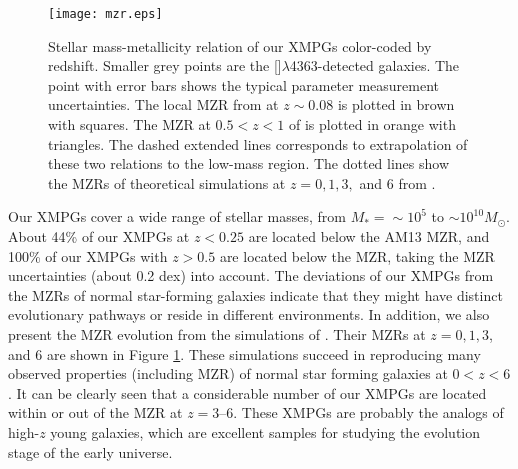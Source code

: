 \documentclass[twocolumn]{aastex631}
\newcommand{\OIIIFOT}{[\mbox{\ion{O}{3}}]$\lambda$4363}
\newcommand{\Msun}{\mbox{$M_{\odot}$}}
\newcommand{\boldtext}[1]{\textcolor[rgb]{0,0,0}{#1}}
\begin{document}
\begin{figure}[htb!]
\centering
\texttt{[image: mzr.eps]}
\caption{Stellar mass-metallicity relation of our XMPGs color-coded by redshift. Smaller grey points are the {\OIIIFOT}-detected galaxies. The point with error bars shows the typical parameter measurement uncertainties. The local MZR from \citet{And13} at $z\sim0.08$ is plotted in brown with squares. The MZR at $0.5<z<1$ of \citet{LyC16} is plotted in orange with triangles. The dashed extended lines corresponds to extrapolation of these two relations to the low-mass region.  The dotted lines show the MZRs of theoretical simulations at $z=0,1,3,$ and 6 from \citet{MaX16}.  \label{fig:mzr}}
\end{figure}

Our XMPGs cover a wide range of stellar masses, from $M_*=\sim 10^5$ to $\sim10^{10}\Msun$. About 44\% of our XMPGs at $z<0.25$ are located below the AM13 MZR, and 100\% of our XMPGs with $z>0.5$ are located below the \citet{LyC16} MZR, taking the MZR uncertainties (about 0.2 dex) into account. The deviations of our XMPGs from the MZRs of normal star-forming galaxies indicate that they might have distinct evolutionary pathways or reside in different environments. In addition, we also present the MZR evolution from the simulations of \citet{MaX16}. Their MZRs at $z=0,1,3$, and 6 are shown in Figure \ref{fig:mzr}. These simulations succeed in reproducing many observed properties (including MZR) of normal star forming galaxies at $0<z<6$. It can be clearly seen that a considerable number of our XMPGs are located within or out of the MZR at $z=$3--6. These XMPGs are probably the analogs of high-$z$ young galaxies, which are excellent samples for studying the evolution stage of the early universe. 

\end{document}
